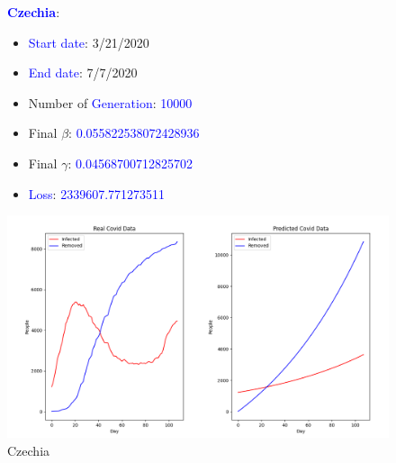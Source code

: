 \documentclass[a4paper]{article}
\begin{document}
    \begin{figure}[ht]
    \centering
    \textbf{\textcolor{blue}{Czechia}}: 
    \begin{itemize}
        \item \textcolor{blue}{Start date}: 3/21/2020
        \item \textcolor{blue}{End date}: 7/7/2020
        \item Number of \textcolor{blue}{Generation}: \textcolor{blue}{10000}
        \item Final $\beta$: \textcolor{blue}{0.055822538072428936}
        \item Final $\gamma$: \textcolor{blue}{0.04568700712825702}
        \item \textcolor{blue}{Loss}: \textcolor{blue}{2339607.771273511}
    \end{itemize}
    
    \includegraphics[width= \linewidth]{ex5-plot/Czechia.png}
    
    \caption{Czechia}
    \end{figure}
\end{document}
